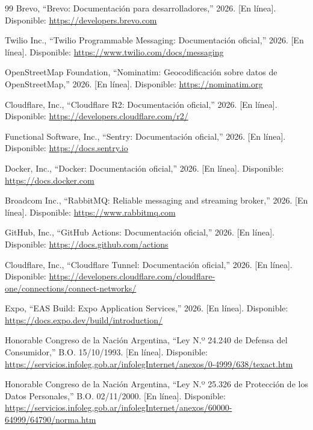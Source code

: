 \documentclass[conference,a4paper]{IEEEtran}
\begin{document}
\begin{thebibliography}{99}
Brevo, ``Brevo: Documentación para desarrolladores,'' 2026. [En línea]. Disponible: \url{https://developers.brevo.com}

Twilio Inc., ``Twilio Programmable Messaging: Documentación oficial,'' 2026. [En línea]. Disponible: \url{https://www.twilio.com/docs/messaging}

OpenStreetMap Foundation, ``Nominatim: Geocodificación sobre datos de OpenStreetMap,'' 2026. [En línea]. Disponible: \url{https://nominatim.org}

Cloudflare, Inc., ``Cloudflare R2: Documentación oficial,'' 2026. [En línea]. Disponible: \url{https://developers.cloudflare.com/r2/}

Functional Software, Inc., ``Sentry: Documentación oficial,'' 2026. [En línea]. Disponible: \url{https://docs.sentry.io}

Docker, Inc., ``Docker: Documentación oficial,'' 2026. [En línea]. Disponible: \url{https://docs.docker.com}

Broadcom Inc., ``RabbitMQ: Reliable messaging and streaming broker,'' 2026. [En línea]. Disponible: \url{https://www.rabbitmq.com}

GitHub, Inc., ``GitHub Actions: Documentación oficial,'' 2026. [En línea]. Disponible: \url{https://docs.github.com/actions}

Cloudflare, Inc., ``Cloudflare Tunnel: Documentación oficial,'' 2026. [En línea]. Disponible: \url{https://developers.cloudflare.com/cloudflare-one/connections/connect-networks/}

Expo, ``EAS Build: Expo Application Services,'' 2026. [En línea]. Disponible: \url{https://docs.expo.dev/build/introduction/}

Honorable Congreso de la Nación Argentina, ``Ley N.º 24.240 de Defensa del Consumidor,'' B.O. 15/10/1993. [En línea]. Disponible: \url{https://servicios.infoleg.gob.ar/infolegInternet/anexos/0-4999/638/texact.htm}

Honorable Congreso de la Nación Argentina, ``Ley N.º 25.326 de Protección de los Datos Personales,'' B.O. 02/11/2000. [En línea]. Disponible: \url{https://servicios.infoleg.gob.ar/infolegInternet/anexos/60000-64999/64790/norma.htm}

\end{thebibliography}
\end{document}
